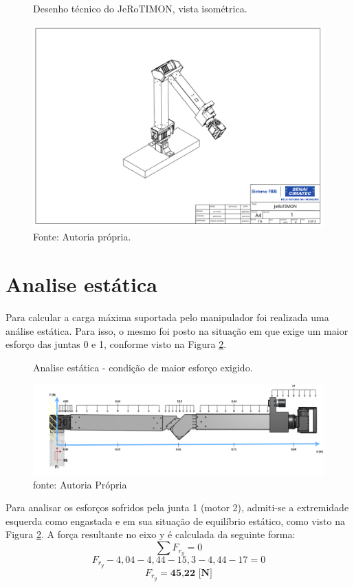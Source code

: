 \documentclass[
12pt,					%
openright,				%
twoside,				%
a4paper,				%
english,
brazil
]{ABNT/abntex2_report}
\begin{document}
	\begin{figure}[H]
		\centering
		\caption{Desenho técnico do JeRoTIMON, vista isométrica.}
		\includegraphics[scale=.55, angle=90]{appendix/isometrica.png}
		\caption*{Fonte: Autoria própria.}
		\label{des:iso}
	\end{figure}

	\section{Analise estática}

	Para calcular a carga máxima suportada pelo manipulador foi realizada uma análise estática. Para isso, o mesmo foi posto na situação em que exige um maior esforço das juntas 0 e 1, conforme visto na Figura \ref{fig:esfoco}.

	\begin{figure}[H]
		\centering
		\caption{Analise estática - condição de maior esforço exigido.}
		\includegraphics[width=1\textwidth]{appendix/esforcos.png}
		\caption*{fonte: Autoria Própria}
		\label{fig:esfoco}
	\end{figure}

	Para analisar os esforços sofridos pela junta 1 (motor 2), admiti-se a extremidade esquerda como engastada e em sua situação de equilíbrio estático, como visto na Figura \ref{fig:esfoco}. A força resultante no eixo y é calculada da seguinte forma: 
	$$ \sum F_{r_{y}} = 0 $$
	$$F_{r_{y}} - 4,04 - 4,44 - 15,3 - 4,44 - 17 = 0$$
	$$ F_{r_{y}} = \textbf{45,22 [N]}  $$
\end{document}
